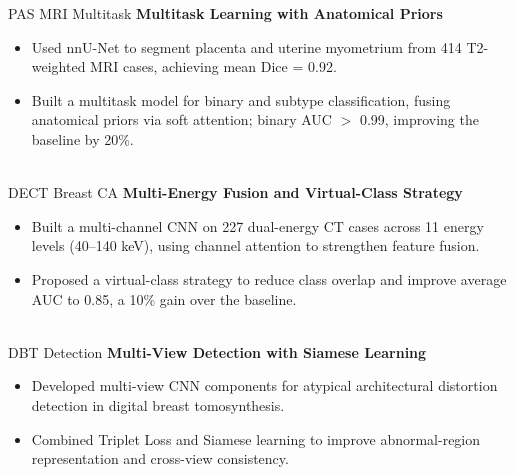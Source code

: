 \documentclass[letterpaper]{DS_class_file} %
\begin{document}
\begin{twenty}
	\twentyitem
	{PAS MRI}
	{Multitask}
	{\textbf{Multitask Learning with Anatomical Priors}}
	{}
	{}
	{\begin{itemize}
		\item Used nnU-Net to segment placenta and uterine myometrium from 414 T2-weighted MRI cases, achieving mean Dice = 0.92.
		\item Built a multitask model for binary and subtype classification, fusing anatomical priors via soft attention; binary AUC $>$ 0.99, improving the baseline by 20\%.
	\end{itemize}}
	\\
	\twentyitem
	{DECT}
	{Breast CA}
	{\textbf{Multi-Energy Fusion and Virtual-Class Strategy}}
	{}
	{}
	{\begin{itemize}
		\item Built a multi-channel CNN on 227 dual-energy CT cases across 11 energy levels (40--140 keV), using channel attention to strengthen feature fusion.
		\item Proposed a virtual-class strategy to reduce class overlap and improve average AUC to 0.85, a 10\% gain over the baseline.
	\end{itemize}}
	\\
	\twentyitem
	{DBT}
	{Detection}
	{\textbf{Multi-View Detection with Siamese Learning}}
	{}
	{}
	{\begin{itemize}
		\item Developed multi-view CNN components for atypical architectural distortion detection in digital breast tomosynthesis.
		\item Combined Triplet Loss and Siamese learning to improve abnormal-region representation and cross-view consistency.
	\end{itemize}}
\end{twenty}


\end{document}
